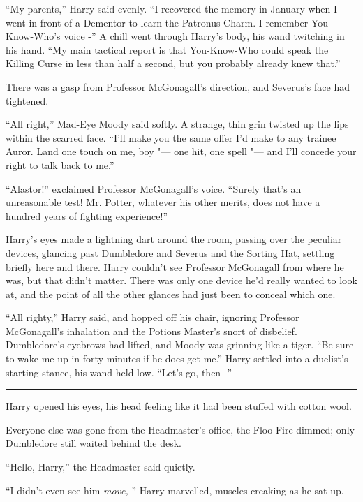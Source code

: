 ``My parents,'' Harry said evenly. ``I recovered the memory in January
when I went in front of a Dementor to learn the Patronus Charm. I
remember You-Know-Who's voice -'' A chill went through Harry's body, his
wand twitching in his hand. ``My main tactical report is that
You-Know-Who could speak the Killing Curse in less than half a second,
but you probably already knew that.''

There was a gasp from Professor McGonagall's direction, and Severus's
face had tightened.

``All right,'' Mad-Eye Moody said softly. A strange, thin grin twisted
up the lips within the scarred face. ``I'll make you the same offer I'd
make to any trainee Auror. Land one touch on me, boy "--- one hit, one
spell "--- and I'll concede your right to talk back to me.''

``Alastor!'' exclaimed Professor McGonagall's voice. ``Surely that's an
unreasonable test! Mr. Potter, whatever his other merits, does not have
a hundred years of fighting experience!''

Harry's eyes made a lightning dart around the room, passing over the
peculiar devices, glancing past Dumbledore and Severus and the Sorting
Hat, settling briefly here and there. Harry couldn't see Professor
McGonagall from where he was, but that didn't matter. There was only one
device he'd really wanted to look at, and the point of all the other
glances had just been to conceal which one.

``All righty,'' Harry said, and hopped off his chair, ignoring Professor
McGonagall's inhalation and the Potions Master's snort of disbelief.
Dumbledore's eyebrows had lifted, and Moody was grinning like a tiger.
``Be sure to wake me up in forty minutes if he does get me.'' Harry
settled into a duelist's starting stance, his wand held low. ``Let's go,
then -''

\begin{center}\rule{3in}{0.4pt}\end{center}

Harry opened his eyes, his head feeling like it had been stuffed with
cotton wool.

Everyone else was gone from the Headmaster's office, the Floo-Fire
dimmed; only Dumbledore still waited behind the desk.

``Hello, Harry,'' the Headmaster said quietly.

``I didn't even see him \emph{move,} '' Harry marvelled, muscles creaking
as he sat up.

